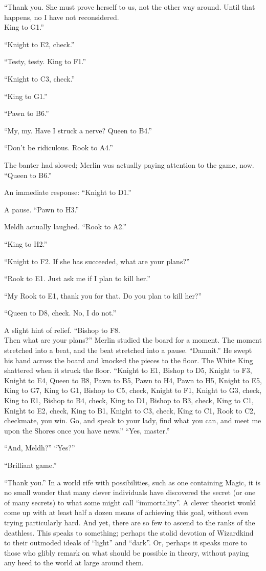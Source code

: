 “Thank you. She must prove herself to us, not the other way around. Until that happens, no I have not reconsidered.\\King to G1.”

“Knight to E2, check.”

“Testy, testy. King to F1.”

“Knight to C3, check.”

“King to G1.”

“Pawn to B6.”

“My, my. Have I struck a nerve? Queen to B4.”

“Don’t be ridiculous. Rook to A4.”

The banter had slowed; Merlin was actually paying attention to the game, now. “Queen to{\el} B6.”

An immediate response: “Knight to D1.”

A pause. “Pawn to H3.”

Meldh actually laughed. “Rook to A2.”

“King to H2.”

“Knight to F2. If she has succeeded, what are your plans?”

“Rook to E1. Just ask me if I plan to kill her.”

“My Rook to E1, thank you for that. Do you plan to kill her?”

“Queen to D8, check. No, I do not.”

A slight hint of relief. “Bishop to F8.\\Then what are your plans?”
\SmallVSpace
Merlin studied the board for a moment. The moment stretched into a beat, and the beat stretched into a pause. “Damnit.” He swept his hand across the board and knocked the pieces to the floor. The White King shattered when it struck the floor. “Knight to E1, Bishop to D5, Knight to F3, Knight to E4, Queen to B8, Pawn to B5, Pawn to H4, Pawn to H5, Knight to E5, King to G7, King to G1, Bishop to C5, check, Knight to F1, Knight to G3, check, King to E1, Bishop to B4, check, King to D1, Bishop to B3, check, King to C1, Knight to E2, check, King to B1, Knight to C3, check, King to C1, Rook to C2, checkmate, you win. Go, and speak to your lady, find what you can, and meet me upon the Shores once you have news.”
\SmallVSpace
“Yes, master.”

“And, Meldh?”
\SmallVSpace
“Yes?”

“Brilliant game.”

“Thank you.”
\simpleline
\pagebreak
In a world rife with possibilities, such as one containing Magic, it is no small wonder that many clever individuals have discovered the secret (or one of many secrets) to what some might call “immortality”. A clever theorist would come up with at least half a dozen means of achieving this goal, without even trying particularly hard. And yet, there are so few to ascend to the ranks of the deathless. This speaks to something; perhaps the stolid devotion of Wizardkind to their outmoded ideals of “light” and “dark”. Or, perhaps it speaks more to those who glibly remark on what should be possible in theory, without paying any heed to the world at large around them.

